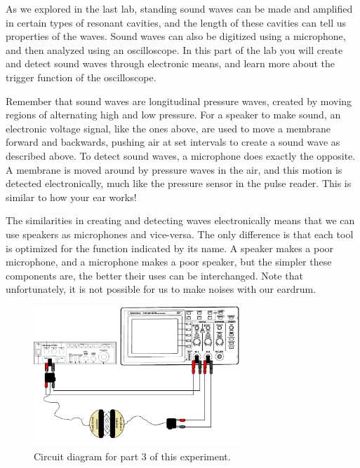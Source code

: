 As we explored in the last lab, standing sound waves can be made and amplified in certain types of resonant cavities, and the length of these cavities can tell us properties of the waves. Sound waves can also be digitized using a microphone, and then analyzed using an oscilloscope. In this part of the lab you will create and detect sound waves through electronic means, and learn more about the trigger function of the oscilloscope.

Remember that sound waves are longitudinal pressure waves, created by moving regions of alternating high and low pressure. For a speaker to make sound, an electronic voltage signal, like the ones above, are used to move a membrane forward and backwards, pushing air at set intervals to create a sound wave as described above. To detect sound waves, a microphone does exactly the opposite. A membrane is moved around by pressure waves in the air, and this motion is detected electronically, much like the pressure sensor in the pulse reader. This is similar to how your ear works!

The similarities in creating and detecting waves electronically means that we can use speakers as microphones and vice-versa. The only difference is that each tool is optimized for the function indicated by its name. A speaker makes a poor microphone, and a microphone makes a poor speaker, but the simpler these components are, the better their uses can be interchanged. Note that unfortunately, it is not possible for us to make noises with our eardrum.

\begin{figure}[h!]
        \centering
            \includegraphics[width=0.7\textwidth]{./Exp1-10/pic/part3.pdf}
        \caption{Circuit diagram for part 3 of this experiment.}
        \label{fig:part3}
\end{figure}

